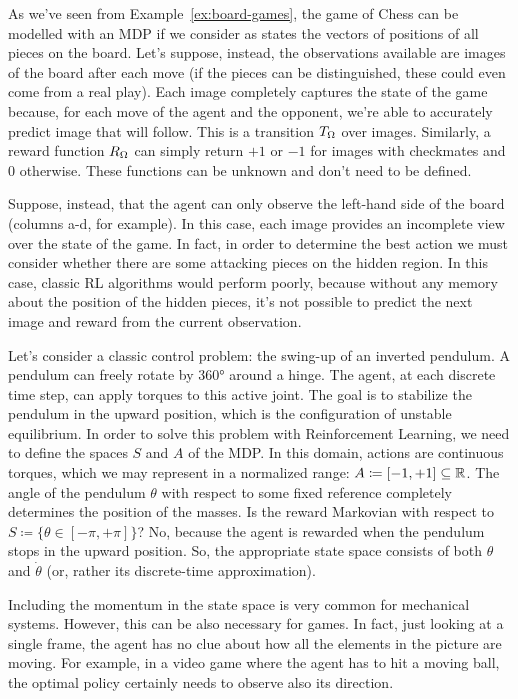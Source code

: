 \begin{example}
	As we've seen from Example~\vref{ex:board-games}, the game of Chess can
	be modelled with an MDP if we consider as states the vectors of positions of
	all pieces on the board. Let's suppose, instead, the observations available
	are images of the board after each move (if the pieces can be distinguished,
	these could even come from a real play). Each image completely captures the
	state of the game because, for each move of the agent and the opponent,
	we're able to accurately predict image that will follow. This is a
	transition $T_\Omega$ over images. Similarly, a reward function $R_\Omega$ can
	simply return $+1$ or $-1$ for images with checkmates and 0 otherwise. These
	functions can be unknown and don't need to be defined.

	Suppose, instead, that the agent can only observe the left-hand side of the
	board (columns a-d, for example). In this case, each image provides an
	incomplete view over the state of the game. In fact, in order to determine
	the best action we must consider whether there are some attacking pieces on
	the hidden region. In this case, classic RL algorithms would perform poorly,
	because without any memory about the position of the hidden pieces, 
	it's not possible to predict the next image and reward from the current
	observation.
\end{example}

\begin{example}
	Let's consider a classic control problem: the swing-up of an inverted
	pendulum. A pendulum can freely rotate by 360° around a hinge. The agent, at
	each discrete time step, can apply torques to this active joint.  The goal
	is to stabilize the pendulum in the upward position, which is the
	configuration of unstable equilibrium. In order to solve this problem with
	Reinforcement Learning, we need to define the spaces $S$ and $A$ of the MDP.
	In this domain, actions are continuous torques, which we may represent in a
	normalized range: $A \coloneqq [-1, +1] \subseteq \mathbb{R}$. The angle of the
	pendulum $\theta$ with respect to some fixed reference completely determines
	the position of the masses. Is the reward Markovian with respect to $S
	\coloneqq \{\theta \in [-\pi, +\pi]\}$? No, because the agent is rewarded
	when the pendulum stops in the upward position. So, the appropriate state
	space consists of both $\theta$ and $\dot\theta$ (or, rather its
	discrete-time approximation).

	Including the momentum in the state space is very common for mechanical
	systems. However, this can be also necessary for games. In fact, just
	looking at a single frame, the agent has no clue about how all the elements
	in the picture are moving.  For example, in a video game where the agent has
	to hit a moving ball, the optimal policy certainly needs to observe also its
	direction.
	\label{ex:motion}
\end{example}


